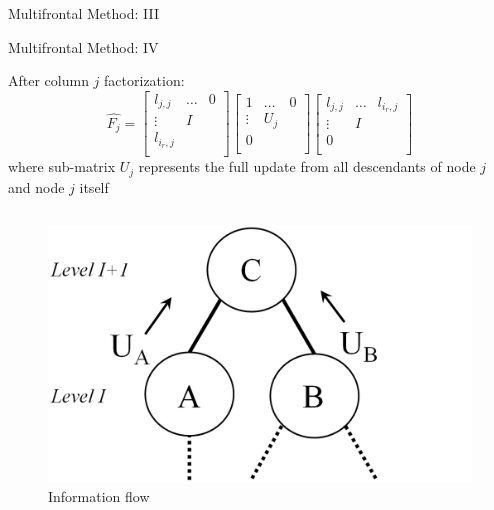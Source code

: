 \begin{frame}[t]{Multifrontal Method: III}
\end{frame}


\begin{frame}[t]{Multifrontal Method: IV}
	\small
	\justifying
	
	After column $j$ factorization:
	\begin{equation} \label{eq:mm-6}
		\hat{F_{j}} = \begin{bmatrix}
		l_{j,j} & \dots & 0 \\
		\vdots & I \\
		l_{i_{r},j} \\
		\end{bmatrix} 
		\begin{bmatrix}
		1 & \dots & 0 \\
		\vdots & U_{j} \\
		0 \\
		\end{bmatrix} 
		\begin{bmatrix}
		l_{j,j} & \dots & l_{i_{r},j} \\
		\vdots & I \\
		0 \\
		\end{bmatrix} 
	\end{equation}
	where sub-matrix $U_{j}$ represents the full update from all descendants of node $j$ and node $j$ itself
	
	
	\begin{columns}
		
	\begin{column}{0.25\textwidth}
		\begin{figure}[!htpb]
			\centering
			\includegraphics[width=1.35\textwidth]{figures/chapter-2/information-flow.png}
			\caption{Information flow}
			\label{fig:information-float}
		\end{figure}
	\end{column}


\end{columns}
\end{frame}
